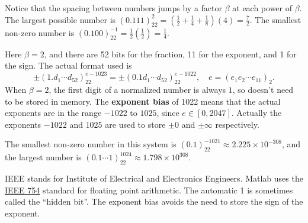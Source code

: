 \documentclass[
  letterpaper,
  DIV=11,
  numbers=noendperiod]{scrreprt}
\begin{document}
\begin{tcolorbox}[enhanced jigsaw, opacityback=0, breakable, title=\textcolor{quarto-callout-note-color}{\faInfo}\hspace{0.5em}{Note}, arc=.35mm, coltitle=black, opacitybacktitle=0.6, bottomrule=.15mm, leftrule=.75mm, left=2mm, colbacktitle=quarto-callout-note-color!10!white, titlerule=0mm, toptitle=1mm, bottomtitle=1mm, colframe=quarto-callout-note-color-frame, rightrule=.15mm, colback=white, toprule=.15mm]

Notice that the spacing between numbers jumps by a factor \(\beta\) at
each power of \(\beta\). The largest possible number is
\((0.111)_22^2 = (\tfrac12 + \tfrac14 + \tfrac18)(4) = \tfrac72\). The
smallest non-zero number is
\((0.100)_22^{-1}=\tfrac12(\tfrac12) = \tfrac14\).

\end{tcolorbox}

Here \(\beta=2\), and there are 52 bits for the fraction, 11 for the
exponent, and 1 for the sign. The actual format used is \[
\pm (1.d_1\cdots d_{52})_22^{e-1023} = \pm (0.1d_1\cdots d_{52})_22^{e-1022}, \quad e = (e_1e_2\cdots e_{11})_2.
\] When \(\beta=2\), the first digit of a normalized number is always
\(1\), so doesn't need to be stored in memory. The \textbf{exponent
bias} of 1022 means that the actual exponents are in the range \(-1022\)
to \(1025\), since \(e\in[0,2047]\). Actually the exponents \(-1022\)
and \(1025\) are used to store \(\pm 0\) and \(\pm\infty\) respectively.

The smallest non-zero number in this system is
\((0.1)_22^{-1021} \approx 2.225\times 10^{-308}\), and the largest
number is \((0.1\cdots 1)_22^{1024} \approx 1.798\times 10^{308}\).

\begin{tcolorbox}[enhanced jigsaw, opacityback=0, breakable, title=\textcolor{quarto-callout-note-color}{\faInfo}\hspace{0.5em}{Note}, arc=.35mm, coltitle=black, opacitybacktitle=0.6, bottomrule=.15mm, leftrule=.75mm, left=2mm, colbacktitle=quarto-callout-note-color!10!white, titlerule=0mm, toptitle=1mm, bottomtitle=1mm, colframe=quarto-callout-note-color-frame, rightrule=.15mm, colback=white, toprule=.15mm]

IEEE stands for Institute of Electrical and Electronics Engineers.
Matlab uses the \href{https://en.wikipedia.org/wiki/IEEE_754}{IEEE 754}
standard for floating point arithmetic. The automatic 1 is sometimes
called the ``hidden bit''. The exponent bias avoids the need to store
the sign of the exponent.

\end{tcolorbox}
\end{document}
